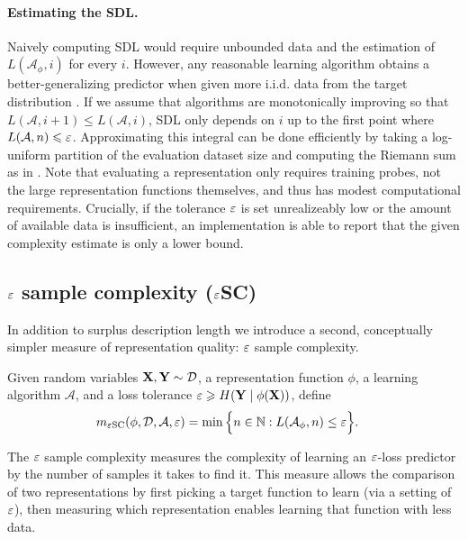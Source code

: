 \paragraph{Estimating the SDL.}
Naively computing SDL would require unbounded data and the estimation of $L(\mathcal{A}_\phi, i)$ for every $i$.
However, any reasonable learning algorithm obtains a better-generalizing predictor when given more i.i.d. data from the target distribution \citep{Kaplan2020ScalingLF}.
If we assume that algorithms are monotonically improving so that $L(\mathcal{A}, i+1) \le L(\mathcal{A}, i)$, SDL only depends on $i$ up to the first point where $L(\mathcal{A}, n) \leqslant \varepsilon$.
Approximating this integral can be done efficiently by taking a log-uniform partition of the evaluation dataset size and computing the Riemann sum as in \citet{Voita2020InformationTheoreticPW}.
Note that evaluating a representation only requires training probes, not the large representation functions themselves, and thus has modest computational requirements.
Crucially, if the tolerance $\varepsilon$ is set unrealizeably low or the amount of available data is insufficient, an implementation is able to report that the given complexity estimate is only a lower bound.


\subsection{$\varepsilon$ sample complexity ($\varepsilon$SC)}

In addition to surplus description length we introduce a second, conceptually simpler measure of representation quality: $\varepsilon$ sample complexity.

\begin{definition} \label{def:sample_complexity}
    Given random variables ${\mathbf{X}}, {\mathbf{Y}} \sim \mathcal{D}$, a representation function $ \phi$, a learning algorithm $\mathcal{A}$, and a loss tolerance $\varepsilon \geqslant H({\mathbf{Y}} \mid \phi({\mathbf{X}}))$, define
    \begin{align}
         m_{\varepsilon\mathrm{SC}}(\phi, \mathcal{D}, \mathcal{A},\varepsilon) &= \min \Big\{ n \in \mathbb{N} : L(\mathcal{A}_\phi, n) \leq \varepsilon \Big\}.
    \end{align}
\end{definition}

The $\varepsilon$ sample complexity measures the complexity of learning an $\varepsilon$-loss predictor by the number of samples it takes
to find it.
This measure allows the comparison of two representations by first picking a target function to learn (via a setting of $\varepsilon$), then measuring which representation enables learning that function with less data.

